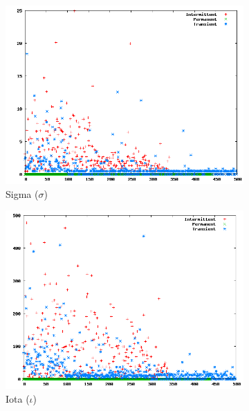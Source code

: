 \begin{figure}
        \centering
			\captionsetup{justification=centering}
        \begin{subfigure}[h]{0.45\linewidth}
                \includegraphics[scale=0.32]{figures/sdsigmap45k.png}
                \caption{Sigma ($\sigma$)}
        \end{subfigure}
        \begin{subfigure}[h]{0.45\linewidth}
                \includegraphics[scale=0.32]{figures/sdiotap45k.png}
                \caption{Iota ($\iota$)}
        \end{subfigure}
			\begin{subfigure}[h]{0.45\linewidth}

\end{subfigure}
\end{figure}
